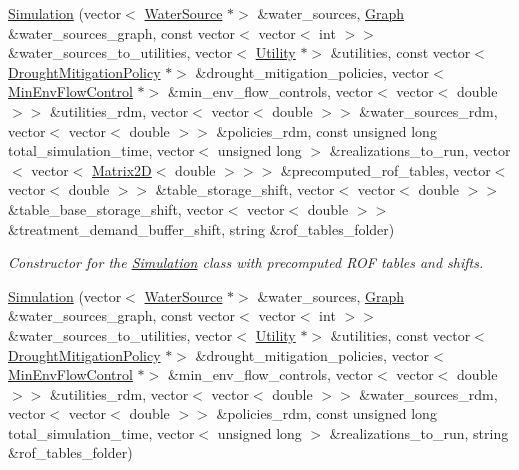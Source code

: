 \begin{DoxyCompactItemize}
\mbox{\hyperlink{classSimulation_a99c76e396f63ca8f98d362c76804345b}{Simulation}} (vector$<$ \mbox{\hyperlink{classWaterSource}{Water\+Source}} $\ast$$>$ \&water\+\_\+sources, \mbox{\hyperlink{classGraph}{Graph}} \&water\+\_\+sources\+\_\+graph, const vector$<$ vector$<$ int $>$$>$ \&water\+\_\+sources\+\_\+to\+\_\+utilities, vector$<$ \mbox{\hyperlink{classUtility}{Utility}} $\ast$$>$ \&utilities, const vector$<$ \mbox{\hyperlink{classDroughtMitigationPolicy}{Drought\+Mitigation\+Policy}} $\ast$$>$ \&drought\+\_\+mitigation\+\_\+policies, vector$<$ \mbox{\hyperlink{classMinEnvFlowControl}{Min\+Env\+Flow\+Control}} $\ast$$>$ \&min\+\_\+env\+\_\+flow\+\_\+controls, vector$<$ vector$<$ double $>$$>$ \&utilities\+\_\+rdm, vector$<$ vector$<$ double $>$$>$ \&water\+\_\+sources\+\_\+rdm, vector$<$ vector$<$ double $>$$>$ \&policies\+\_\+rdm, const unsigned long total\+\_\+simulation\+\_\+time, vector$<$ unsigned long $>$ \&realizations\+\_\+to\+\_\+run, vector$<$ vector$<$ \mbox{\hyperlink{classMatrix2D}{Matrix2D}}$<$ double $>$$>$$>$ \&precomputed\+\_\+rof\+\_\+tables, vector$<$ vector$<$ double $>$$>$ \&table\+\_\+storage\+\_\+shift, vector$<$ vector$<$ double $>$$>$ \&table\+\_\+base\+\_\+storage\+\_\+shift, vector$<$ vector$<$ double $>$$>$ \&treatment\+\_\+demand\+\_\+buffer\+\_\+shift, string \&rof\+\_\+tables\+\_\+folder)
\begin{DoxyCompactList}\small\item\em Constructor for the \mbox{\hyperlink{classSimulation}{Simulation}} class with precomputed R\+OF tables and shifts. \end{DoxyCompactList}\item 
\mbox{\hyperlink{classSimulation_a68f43435cf8308d5415cdfcdb84e1fac}{Simulation}} (vector$<$ \mbox{\hyperlink{classWaterSource}{Water\+Source}} $\ast$$>$ \&water\+\_\+sources, \mbox{\hyperlink{classGraph}{Graph}} \&water\+\_\+sources\+\_\+graph, const vector$<$ vector$<$ int $>$$>$ \&water\+\_\+sources\+\_\+to\+\_\+utilities, vector$<$ \mbox{\hyperlink{classUtility}{Utility}} $\ast$$>$ \&utilities, const vector$<$ \mbox{\hyperlink{classDroughtMitigationPolicy}{Drought\+Mitigation\+Policy}} $\ast$$>$ \&drought\+\_\+mitigation\+\_\+policies, vector$<$ \mbox{\hyperlink{classMinEnvFlowControl}{Min\+Env\+Flow\+Control}} $\ast$$>$ \&min\+\_\+env\+\_\+flow\+\_\+controls, vector$<$ vector$<$ double $>$$>$ \&utilities\+\_\+rdm, vector$<$ vector$<$ double $>$$>$ \&water\+\_\+sources\+\_\+rdm, vector$<$ vector$<$ double $>$$>$ \&policies\+\_\+rdm, const unsigned long total\+\_\+simulation\+\_\+time, vector$<$ unsigned long $>$ \&realizations\+\_\+to\+\_\+run, string \&rof\+\_\+tables\+\_\+folder)
$$
\end{DoxyCompactItemize}
